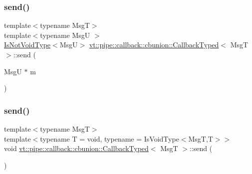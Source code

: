 \mbox{\label{structvt_1_1pipe_1_1callback_1_1cbunion_1_1_callback_typed_afdbf535b3210a84aaaeae0b9b3edc35f}} 
\subsubsection{\texorpdfstring{send()}{send()}\hspace{0.1cm}{\footnotesize\ttfamily [2/3]}}
{\footnotesize\ttfamily template$<$typename MsgT$>$ \\
template$<$typename MsgU $>$ \\
\hyperlink{structvt_1_1pipe_1_1callback_1_1cbunion_1_1_callback_typed_a57e15e61b171c50bff2e7a0dd9078f46}{Is\+Not\+Void\+Type}$<$MsgU$>$ \hyperlink{structvt_1_1pipe_1_1callback_1_1cbunion_1_1_callback_typed}{vt\+::pipe\+::callback\+::cbunion\+::\+Callback\+Typed}$<$ MsgT $>$\+::send (\begin{DoxyParamCaption}\item[{MsgU $\ast$}]{m }\end{DoxyParamCaption})\hspace{0.3cm}{\ttfamily [inline]}}

\mbox{\label{structvt_1_1pipe_1_1callback_1_1cbunion_1_1_callback_typed_aa118972d857f12ec7433e01440b2dfd3}} 
\subsubsection{\texorpdfstring{send()}{send()}\hspace{0.1cm}{\footnotesize\ttfamily [3/3]}}
{\footnotesize\ttfamily template$<$typename MsgT$>$ \\
template$<$typename T  = void, typename  = Is\+Void\+Type$<$\+Msg\+T,\+T$>$$>$ \\
void \hyperlink{structvt_1_1pipe_1_1callback_1_1cbunion_1_1_callback_typed}{vt\+::pipe\+::callback\+::cbunion\+::\+Callback\+Typed}$<$ MsgT $>$\+::send (\begin{DoxyParamCaption}{ }\end{DoxyParamCaption})\hspace{0.3cm}{\ttfamily [inline]}}

